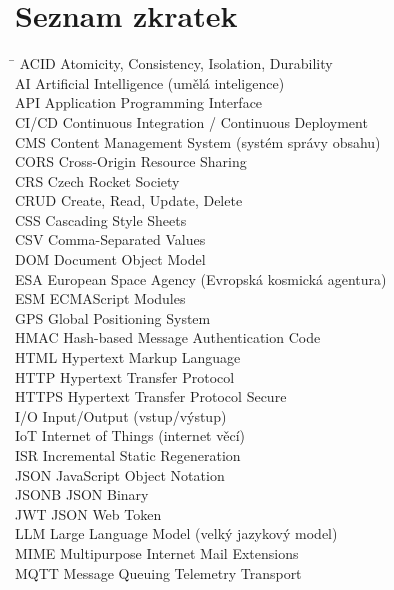 \chapter*{Seznam zkratek}

\begin{tabbing}
\hspace{3cm} \= \kill
ACID \> Atomicity, Consistency, Isolation, Durability \\
AI \> Artificial Intelligence (umělá inteligence) \\
API \> Application Programming Interface \\
CI/CD \> Continuous Integration / Continuous Deployment \\
CMS \> Content Management System (systém správy obsahu) \\
CORS \> Cross-Origin Resource Sharing \\
CRS \> Czech Rocket Society \\
CRUD \> Create, Read, Update, Delete \\
CSS \> Cascading Style Sheets \\
CSV \> Comma-Separated Values \\
DOM \> Document Object Model \\
ESA \> European Space Agency (Evropská kosmická agentura) \\
ESM \> ECMAScript Modules \\
GPS \> Global Positioning System \\
HMAC \> Hash-based Message Authentication Code \\
HTML \> Hypertext Markup Language \\
HTTP \> Hypertext Transfer Protocol \\
HTTPS \> Hypertext Transfer Protocol Secure \\
I/O \> Input/Output (vstup/výstup) \\
IoT \> Internet of Things (internet věcí) \\
ISR \> Incremental Static Regeneration \\
JSON \> JavaScript Object Notation \\
JSONB \> JSON Binary \\
JWT \> JSON Web Token \\
LLM \> Large Language Model (velký jazykový model) \\
MIME \> Multipurpose Internet Mail Extensions \\
MQTT \> Message Queuing Telemetry Transport \\

\end{tabbing}
